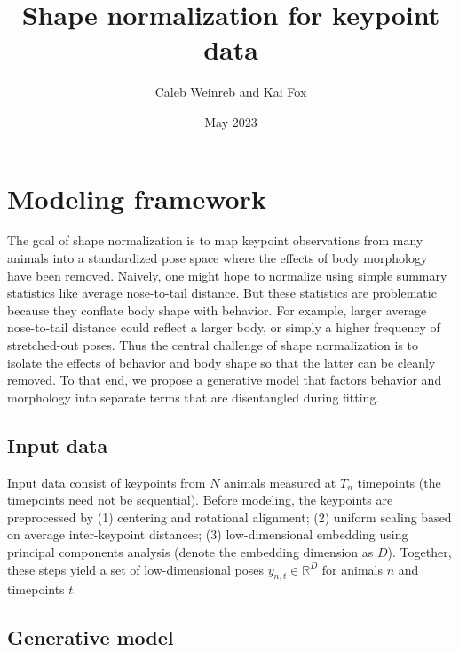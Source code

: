 \documentclass{article}         %
\title{Shape normalization for keypoint data}
\author{Caleb Weinreb and Kai Fox}
\date{May 2023}
\begin{document}
\maketitle

\section{Modeling framework}
\label{sec:model-fwk}

The goal of shape normalization is to map keypoint observations from many animals into a standardized pose space where the effects of body morphology have been removed. Naively, one might hope to normalize using simple summary statistics like average nose-to-tail distance. But these statistics are problematic because they conflate body shape with behavior. For example, larger average nose-to-tail distance could reflect a larger body, or simply a higher frequency of stretched-out poses. Thus the central challenge of shape normalization is to isolate the effects of behavior and body shape so that the latter can be cleanly removed. To that end, we propose a generative model that factors behavior and morphology into separate terms that are disentangled during fitting.

\subsection{Input data}

Input data consist of keypoints from $N$ animals measured at $T_n$ timepoints (the timepoints need not be sequential). Before modeling, the keypoints are preprocessed by (1) centering and rotational alignment; (2) uniform scaling based on average inter-keypoint distances; (3) low-dimensional embedding using principal components analysis (denote the embedding dimension as $D$). Together, these steps yield a set of low-dimensional poses $y_{n,t} \in \mathbb{R}^D$ for animals $n$ and timepoints $t$. 

\subsection{Generative model}
\label{sec:gen-model}
\end{document}
